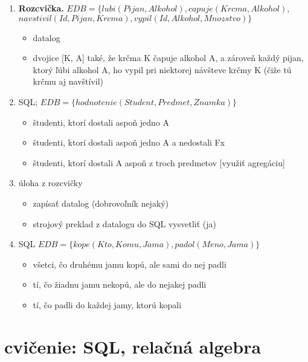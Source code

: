 \documentclass[10pt, a4paper]{article}
\begin{document}
\begin{enumerate}
\item {\bf Rozcvička.} $EDB=\{lubi(Pijan, Alkohol), capuje(Krcma, Alkohol),$\\
\hspace*{1cm} $navstivil(Id, Pijan, Krcma), vypil(Id, Alkohol, Mnozstvo)\}$
\begin{itemize}
    \item datalog
    \item dvojice [K, A] také, že krčma K čapuje alkohol A, a zároveň každý pijan, ktorý ľúbi alkohol A, ho vypil pri niektorej návšteve krčmy K (čiže tú krčmu aj navštívil)
\end{itemize}

\item SQL; $EDB=\{hodnotenie(Student, Predmet, Znamka)\}$
\begin{itemize}
    \item študenti, ktorí dostali aspoň jedno A
    \item študenti, ktorí dostali aspoň jedno A a nedostali Fx
    \item študenti, ktorí dostali A aspoň z troch predmetov [využiť agregáciu]
\end{itemize}

\item úloha z rozcvičky  
\begin{itemize}
    \item zapísať datalog (dobrovoľník nejaký)
    \item strojový preklad z datalogu do SQL vysvetliť (ja)
\end{itemize}

\item SQL
$EDB = \{kope(Kto, Komu, Jama), padol(Meno, Jama)\}$
\begin{itemize}
    \item všetci, čo druhému jamu kopú, ale sami do nej padli
    \item tí, čo žiadnu jamu nekopú, ale do nejakej padli
    \item tí, čo padli do každej jamy, ktorú kopali
\end{itemize}

\end{enumerate}




\section{cvičenie: SQL, relačná algebra}
\end{document}
